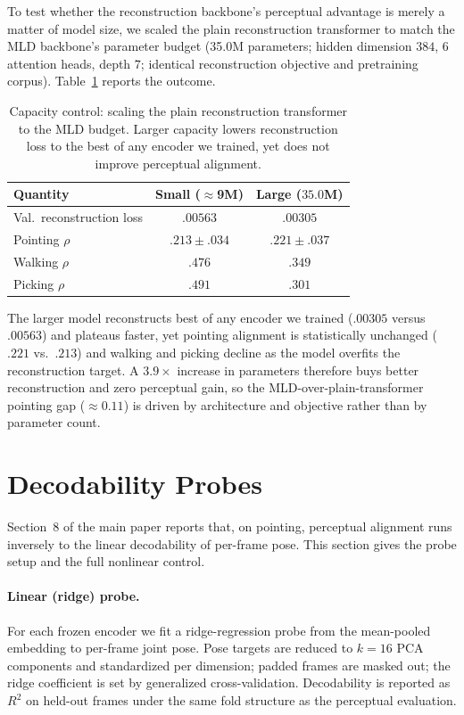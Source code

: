 \documentclass[letterpaper]{article} %
\begin{document}
To test whether the reconstruction backbone's perceptual advantage is merely a matter of model size, we
scaled the plain reconstruction transformer to match the MLD backbone's parameter budget (35.0M
parameters; hidden dimension $384$, $6$ attention heads, depth $7$; identical reconstruction objective
and pretraining corpus). Table~\ref{tab:capacity-supp} reports the outcome.

\begin{table}[htbp]
\centering
\small
\setlength{\tabcolsep}{5pt}
\caption{Capacity control: scaling the plain reconstruction transformer to the MLD budget. Larger
capacity lowers reconstruction loss to the best of any encoder we trained, yet does not improve
perceptual alignment.}
\label{tab:capacity-supp}
\begin{tabular}{lcc}
\toprule
Quantity & Small ($\approx$9M) & Large ($35.0$M) \\
\midrule
Val.\ reconstruction loss & $.00563$ & $\mathbf{.00305}$ \\
Pointing $\rho$ & $.213{\scriptstyle\pm}.034$ & $.221{\scriptstyle\pm}.037$ \\
Walking $\rho$ & $\mathbf{.476}$ & $.349$ \\
Picking $\rho$ & $\mathbf{.491}$ & $.301$ \\
\bottomrule
\end{tabular}
\end{table}

The larger model reconstructs best of any encoder we trained ($.00305$ versus $.00563$) and plateaus
faster, yet pointing alignment is statistically unchanged ($.221$ vs.\ $.213$) and walking and picking
decline as the model overfits the reconstruction target. A $3.9\times$ increase in parameters therefore
buys better reconstruction and zero perceptual gain, so the MLD-over-plain-transformer pointing gap
($\approx\!0.11$) is driven by architecture and objective rather than by parameter count.

\section{Decodability Probes}
\label{app:probe}

Section~8 of the main paper reports that, on pointing, perceptual alignment runs inversely to the
linear decodability of per-frame pose. This section gives the probe setup and the full nonlinear
control.

\paragraph{Linear (ridge) probe.}
For each frozen encoder we fit a ridge-regression probe from the mean-pooled embedding to per-frame
joint pose. Pose targets are reduced to $k=16$ PCA components and standardized per dimension; padded
frames are masked out; the ridge coefficient is set by generalized cross-validation. Decodability is
reported as $R^2$ on held-out frames under the same fold structure as the perceptual evaluation.
\end{document}
